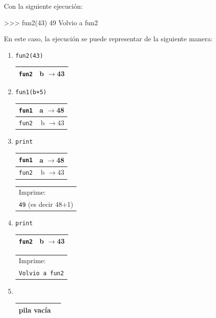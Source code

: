Con la siguiente ejecución:

\begin{codigo-python-sn}
>>> fun2(43)
49
Volvio a fun2
\end{codigo-python-sn}

En este caso, la ejecución se puede representar de la siguiente manera:

\begin{enumerate}

\item  \verb|fun2(43) | \hspace{1.5cm}
	\begin{tabular}{r|r|}
	\hline
	\verb|fun2|&b $\rightarrow$43\\
	\hline
	\end{tabular}

\item  \verb|fun1(b+5)| \hspace{1.5cm}
	\begin{tabular}{r|r|}
	\hline
	\verb|fun1|&a $\rightarrow$48\\
	\hline
	\hline
	\verb|fun2|&b $\rightarrow$43\\
	\hline
	\end{tabular}

\item  \verb|print    | \hspace{1.5cm}
	\begin{tabular}{r|r|}
	\hline
	\verb|fun1|&a $\rightarrow$48\\
	\hline
	\hline
	\verb|fun2|&b $\rightarrow$43\\
	\hline
	\end{tabular}
	\hspace{1cm}
	\begin{tabular}{l}
	Imprime: \\
	{\tt 49} (es decir 48+1)
	\end{tabular}

\item  \verb|print    | \hspace{1.5cm}
	\begin{tabular}{r|r|}
	\hline
	\verb|fun2|&b $\rightarrow$43\\
	\hline
	\end{tabular}
	\hspace{1cm}
	\begin{tabular}{l}
	Imprime: \\
	{\tt Volvio a fun2}
	\end{tabular}

\item  \verb|         | \hspace{1.5cm}
	\begin{tabular}{r|r|}
	\hline
	pila vacía\\
	\hline
	\end{tabular}

\end{enumerate}

